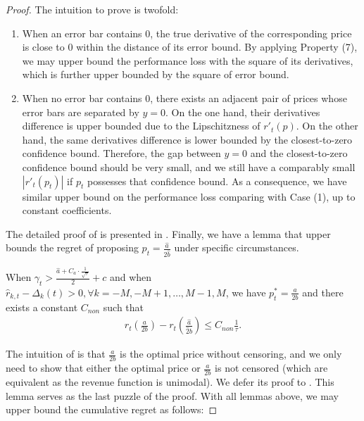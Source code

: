 \begin{proof}
The intuition to prove  is twofold:
\begin{enumerate}
    \item When an error bar contains $0$, the true derivative of the corresponding price is close to $0$ within the distance of its error bound. By applying  Property (7), we may upper bound the performance loss with the square of its derivatives, which is further upper bounded by the square of error bound.
    \item When no error bar contains $0$, there exists an adjacent pair of prices whose error bars are separated by $y=0$. On the one hand, their derivatives difference is upper bounded due to the Lipschitzness of $r'_t(p)$. On the other hand, the same derivatives difference is lower bounded by the closest-to-zero confidence bound. Therefore, the gap between $y=0$ and the closest-to-zero confidence bound should be very small, and we still have a comparably small $|r'_t(p_t)|$ if $p_t$ possesses that confidence bound. As a consequence, we have similar upper bound on the performance loss comparing with Case (1), up to constant coefficients.
\end{enumerate}
The detailed proof of  is presented in . Finally, we have a lemma that upper bounds the regret of proposing $p_t=\frac{\hat a}{2\hat b}$ under specific circumstances.
\begin{lemma}
    \label{lemma:corner_case}
    When $\gamma_t>\frac{\hat a + C_a\cdot\frac1{\sqrt{\tau}}}2+c$ and when $\hat r_{k,t}-\Delta_k(t)>0, \forall k=-M, -M+1,\ldots, M-1, M$, we have $p_t^*=\frac{a}{2b}$ and there exists a constant $C_{non}$ such that
    \begin{equation}
        \label{eq:lemma_corner_case}
        \begin{aligned}
            r_t(\frac{a}{2b})-r_t(\frac{\hat a}{\hat 2b}) \leq C_{non}\frac1{\tau}.
        \end{aligned}
    \end{equation}
\end{lemma}



The intuition of  is that $\frac{a}{2b}$ is the optimal price without censoring, and we only need to show that either the optimal price or $\frac{a}{2b}$ is not censored (which are equivalent as the revenue function is unimodal). We defer its proof to . This lemma serves as the last puzzle of the proof. With all lemmas above, we may upper bound the cumulative regret as follows:


\end{proof}
